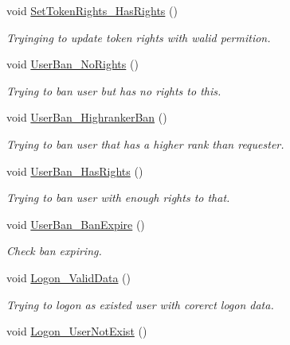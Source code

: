 \begin{DoxyCompactItemize}
void \mbox{\hyperlink{class_authority_controller_1_1_tests_1_1_queries_aa7fb783f7b670bc2daf142f97561cfae}{Set\+Token\+Rights\+\_\+\+Has\+Rights}} ()
\begin{DoxyCompactList}\small\item\em Tryinging to update token rights with walid permition. \end{DoxyCompactList}\item 
void \mbox{\hyperlink{class_authority_controller_1_1_tests_1_1_queries_a16f5db1a247a06e5b585b89d422f8ef5}{User\+Ban\+\_\+\+No\+Rights}} ()
\begin{DoxyCompactList}\small\item\em Trying to ban user but has no rights to this. \end{DoxyCompactList}\item 
void \mbox{\hyperlink{class_authority_controller_1_1_tests_1_1_queries_a07a7a3e3f8136203cbafe2334180ac46}{User\+Ban\+\_\+\+Highranker\+Ban}} ()
\begin{DoxyCompactList}\small\item\em Trying to ban user that has a higher rank than requester. \end{DoxyCompactList}\item 
void \mbox{\hyperlink{class_authority_controller_1_1_tests_1_1_queries_a0d8db80983626e432963bf17eda12b98}{User\+Ban\+\_\+\+Has\+Rights}} ()
\begin{DoxyCompactList}\small\item\em Trying to ban user with enough rights to that. \end{DoxyCompactList}\item 
void \mbox{\hyperlink{class_authority_controller_1_1_tests_1_1_queries_aa12eafe223e2c48ace89a4dd2a8da7c0}{User\+Ban\+\_\+\+Ban\+Expire}} ()
\begin{DoxyCompactList}\small\item\em Check ban expiring. \end{DoxyCompactList}\item 
void \mbox{\hyperlink{class_authority_controller_1_1_tests_1_1_queries_a3cd254060908d25ee375be4c019a5bbc}{Logon\+\_\+\+Valid\+Data}} ()
\begin{DoxyCompactList}\small\item\em Trying to logon as existed user with corerct logon data. \end{DoxyCompactList}\item 
void \mbox{\hyperlink{class_authority_controller_1_1_tests_1_1_queries_a2d9af2b69951d0498670248829c0e2ab}{Logon\+\_\+\+User\+Not\+Exist}} ()

\end{DoxyCompactItemize}
